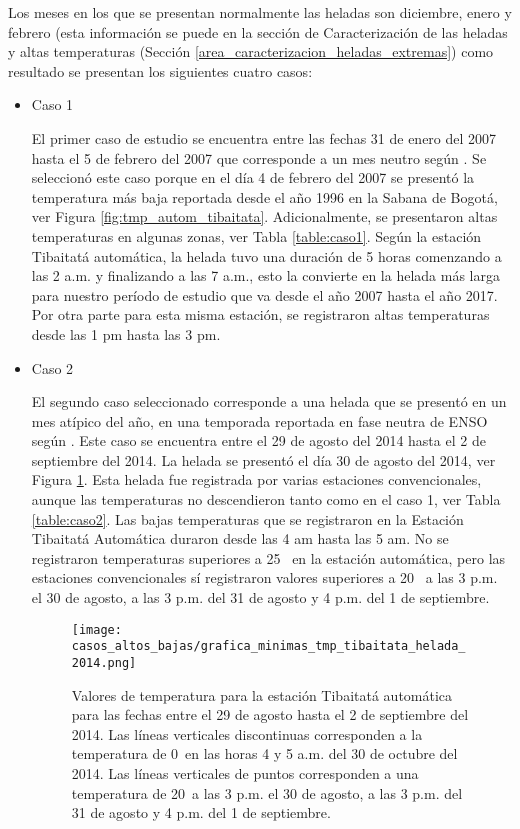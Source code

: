 Los meses en los que se presentan normalmente las heladas son diciembre, enero y febrero (esta información se puede en la sección de Caracterización de las heladas y altas temperaturas (Sección \ref{area_caracterizacion_heladas_extremas}) como resultado se presentan los siguientes cuatro casos:



\begin{itemize}
\item{Caso 1}%

El primer caso de estudio se encuentra entre las fechas 31 de enero del 2007 hasta el 5 de febrero del 2007 que corresponde a un mes neutro según \citet{NOAA-ORI}. Se seleccionó este caso porque en el día 4 de febrero del 2007 se presentó la temperatura más baja reportada desde el año 1996 en la Sabana de Bogotá, ver Figura   \ref{fig:tmp_autom_tibaitata}. Adicionalmente, se presentaron altas temperaturas en algunas zonas,  ver Tabla \ref{table:caso1}. Según la estación Tibaitatá automática, la helada tuvo una duración de 5 horas comenzando a las 2 a.m. y finalizando a las 7 a.m., esto la convierte en la helada más larga para nuestro período de estudio que va desde el año 2007 hasta el año 2017. Por otra parte para esta misma estación, se registraron altas temperaturas desde las 1 pm hasta las 3 pm.

\item{Caso 2}%

El segundo caso seleccionado corresponde a una helada que se presentó en un mes atípico del año, en una temporada reportada en fase neutra de ENSO según \citet{NOAA-ORI}. Este caso se encuentra entre el 29 de agosto del 2014 hasta el 2 de septiembre del 2014. La helada se presentó el día 30 de agosto del 2014, ver Figura \ref{fig:tmp_autom_Tibaitatá_2014}. Esta helada fue registrada por varias estaciones convencionales, aunque las temperaturas no descendieron tanto como en el caso 1, ver Tabla \ref{table:caso2}.  Las bajas temperaturas que se registraron en la Estación Tibaitatá Automática duraron desde las 4 am hasta las 5 am. No se registraron temperaturas superiores a 25 \celc\ en la estación automática, pero las estaciones convencionales sí registraron valores superiores a 20 \celsius\ a las 3 p.m. el 30 de agosto, a las 3 p.m. del 31 de agosto y 4 p.m. del 1 de septiembre.

\begin{figure}[H]
    \centering
    \caption{Valores de temperatura para la estación Tibaitatá automática para las fechas entre el 29 de agosto hasta el 2 de septiembre del 2014. Las líneas verticales discontinuas corresponden a la temperatura de 0\celc\ en las horas 4 y 5 a.m. del 30 de octubre del 2014. Las líneas verticales de puntos corresponden a una temperatura de 20\celc\ a las 3 p.m. el 30 de agosto, a las 3 p.m. del 31 de agosto y 4 p.m. del 1 de septiembre.}
    \texttt{[image: casos\_altos\_bajas/grafica\_minimas\_tmp\_tibaitata\_helada\_2014.png]}
    \label{fig:tmp_autom_Tibaitatá_2014}
\end{figure}



\end{itemize}
